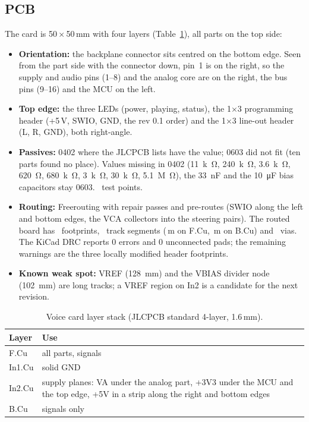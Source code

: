 \documentclass[11pt,a4paper]{article}
\begin{document}
\subsection{PCB}\label{sec:voicepcb}
The card is 50\,$\times$\,50\,mm with four layers (Table~\ref{tab:stackvoice}), all parts on the top side:
\begin{itemize}
  \item \textbf{Orientation:} the backplane connector sits centred on the bottom edge. Seen from the part side with the
    connector down, pin~1 is on the right, so the supply and audio pins (1--8) and the analog core are on the right,
    the bus pins (9--16) and the MCU on the left.
  \item \textbf{Top edge:} the three LEDs (power, playing, status), the 1$\times$3 programming header (+5\,V, SWIO, GND,
    the rev 0.1 order) and the 1$\times$3 line-out header (L, R, GND), both right-angle.
  \item \textbf{Passives:} 0402 where the JLCPCB lists have the value; 0603 did not fit (ten parts found no place).
    Values missing in 0402 (\SI{11}{k\ohm}, \SI{240}{k\ohm}, \SI{3.6}{k\ohm}, \SI{620}{\ohm},
    \SI{680}{k\ohm}, \SI{3}{k\ohm}, \SI{30}{k\ohm}, \SI{5.1}{M\ohm}), the \SI{33}{nF} and the \SI{10}{\micro F} bias
    capacitors stay 0603. \statVoiceTp\ test points.
  \item \textbf{Routing:} Freerouting with repair passes and pre-routes (SWIO along the left and bottom edges, the
    VCA collectors into the steering pairs). The routed board has \statVoiceFootprints\ footprints,
    \statVoiceSegments\ track segments (\statVoiceLenF\,m on F.Cu, \statVoiceLenB\,m on B.Cu) and \statVoiceVias\
    vias. The KiCad DRC reports 0 errors and 0 unconnected pads; the remaining warnings are the three locally
    modified header footprints.
  \item \textbf{Known weak spot:} VREF (\SI{128}{mm}) and the VBIAS divider node (\SI{102}{mm}) are long tracks; a
    VREF region on In2 is a candidate for the next revision.
\end{itemize}

\begin{table}[htbp]
\centering\small
\caption{Voice card layer stack (JLCPCB standard 4-layer, 1.6\,mm).}\label{tab:stackvoice}
\begin{tabularx}{\textwidth}{@{}l X@{}}
\toprule
Layer & Use \\
\midrule
F.Cu & all parts, signals \\
In1.Cu & solid GND \\
In2.Cu & supply planes: VA under the analog part, +3V3 under the MCU and the top edge, +5V in a strip along the right
  and bottom edges \\
B.Cu & signals only \\
\bottomrule
\end{tabularx}
\end{table}
\end{document}
